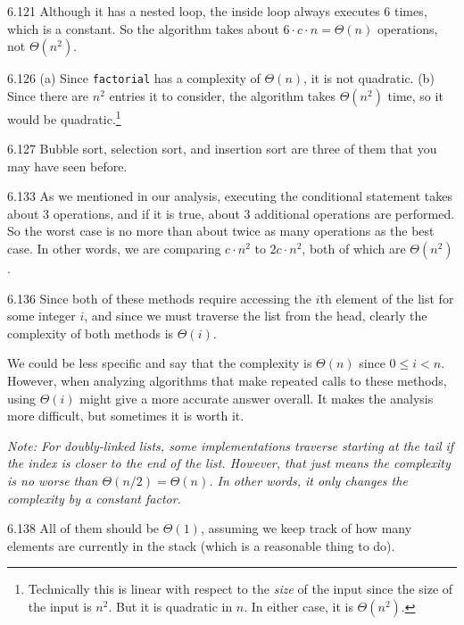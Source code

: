 \begin{Answer}{6.121}
Although it has a nested loop, the inside loop always executes $6$ times, which
is a constant.  So the algorithm takes about $6\cdot c\cdot n=\Theta(n)$ operations, not $\Theta(n^2)$.
\end{Answer}
\begin{Answer}{6.126}
(a) Since \verb+factorial+ has a complexity of $\Theta(n)$, it is not quadratic.
(b) Since there are $n^2$ entries it to consider,
the algorithm takes $\Theta(n^2)$ time, so it would be quadratic.\footnote{Technically this is linear with respect to the {\em size} of the input since the
size of the input is $n^2$.  But it is quadratic in $n$.  In either case, it is
$\Theta(n^2)$.}
\end{Answer}
\begin{Answer}{6.127}
Bubble sort, selection sort, and insertion sort are three of them that you may have seen before.
\end{Answer}
\begin{Answer}{6.133}
As we mentioned in our analysis, executing the conditional statement takes about
$3$ operations, and if it is true, about $3$ additional operations are performed.  So
the worst case is no more than about twice as many operations as the best case.  In other
words, we are comparing $c\cdot n^2$ to $2c\cdot n^2$, both of which are $\Theta(n^2)$.
\end{Answer}
\begin{Answer}{6.136}
Since both of these methods require accessing the $i$th element of the list
for some integer $i$, and since we must traverse the list from the head, clearly
the complexity of both methods is $\Theta(i)$.

We could be less specific and say that the complexity is $\Theta(n)$ since $0\leq i <n$.
However, when analyzing algorithms that make repeated calls to these methods,
using $\Theta(i)$ might give a more accurate answer overall.  It makes the analysis
more difficult, but sometimes it is worth it.

{\em Note: For doubly-linked lists,
some implementations traverse starting at the tail if the index is closer to the end
of the list.  However, that just means the complexity is no worse than $\Theta(n/2)=\Theta(n)$.
In other words, it only changes the complexity by a constant factor.}
\end{Answer}
\begin{Answer}{6.138}
All of them should be $\Theta(1)$, assuming we keep track of how many elements
are currently in the stack (which is a reasonable thing to do).
\end{Answer}
